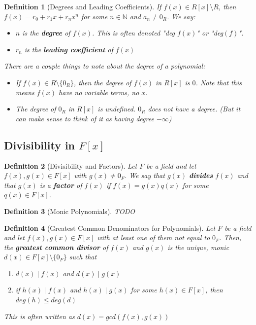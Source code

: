\documentclass{article}
\theoremstyle{break}
\newtheorem{definition}{Definition}[subsection]
\newcommand*{\N}{\mathbb{N}}
\begin{document}
\begin{definition}[Degrees and Leading Coefficients]
  If $f(x) \in R[x] \setminus R$, then $f(x) = r_0 + r_1x + r_n x^n$ for some
  $n \in \N$ and $a_n \neq 0_R$. We say:

  \begin{itemize}
    \item $n$ is the \textbf{degree} of $f(x)$. This is often denoted
    "deg $f(x)$" or "deg$(f)$".
    \item $r_n$ is the \textbf{leading coefficient} of $f(x)$
  \end{itemize}

  There are a couple things to note about the degree of a polynomial:
  \begin{itemize}
    \item If $f(x) \in R \setminus \{ 0_R \}$, then the degree of $f(x)$ in
    $R[x]$ is $0$. Note that this means $f(x)$ have no variable terms, no $x$. 
    \item The degree of $0_R$ in $R[x]$ is undefined. $0_R$ does not have a
    degree. (But it can make sense to think of it as having degree $-\infty$)
  \end{itemize}
\end{definition}

\subsection{Divisibility in $F[x]$}

\begin{definition}[Divisibility and Factors]
  Let $F$ be a field and let $f(x), g(x) \in F[x]$ with $g(x) \neq 0_F$. We say
  that $g(x)$ \textbf{divides} $f(x)$ and that $g(x)$ is a \textbf{factor} of
  $f(x)$ if $f(x) = g(x)q(x)$ for some $q(x) \in F[x]$.
\end{definition}

\begin{definition}[Monic Polynomials]
  TODO
\end{definition}

\begin{definition}[Greatest Common Denominators for Polynomials]
  Let $F$ be a field and let $f(x), g(x) \in F[x]$ with at least one of them
  not equal to $0_F$. Then, the \textbf{greatest common divisor} of $f(x)$ and
  $g(x)$ is the unique, monic $d(x) \in F[x] \setminus \{0_F\}$ such that 
  \begin{enumerate}
    \item $d(x) \mid f(x)$ and $d(x) \mid g(x)$
    \item if $h(x) \mid f(x)$ and $h(x) \mid g(x)$ for some $h(x) \in F[x]$,
    then $deg(h) \leq deg(d)$
  \end{enumerate}
  This is often written as $d(x) = gcd(f(x), g(x))$
\end{definition}
\end{document}
